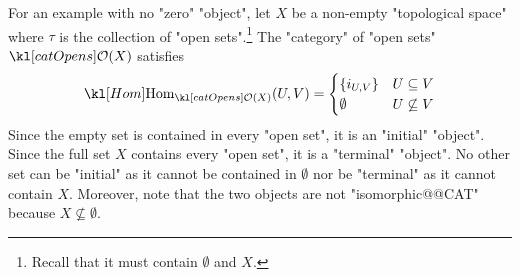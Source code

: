 \documentclass[main.tex]{subfiles}
\begin{document}
\begin{exmps}
\begin{enumerate}
		For an example with no "zero" "object", let $X$ be a non-empty "topological space" where $\tau$ is the collection of "open sets".\footnote{Recall that it must contain $\emptyset$ and $X$.} The "category" of "open sets" $\catOpens(X)$ satisfies
		\[\Hom_{\catOpens(X)}(U,V) = \begin{cases}\{i_{U,V}\} & U \subseteq V\\ \emptyset & U \not\subseteq V\end{cases}\]
		Since the empty set is contained in every "open set", it is an "initial" "object". Since the full set $X$ contains every "open set", it is a "terminal" "object". No other set can be "initial" as it cannot be contained in $\emptyset$ nor be "terminal" as it cannot contain $X$. Moreover, note that the two objects are not "isomorphic@@CAT" because $X \not\subseteq \emptyset$.
	\end{enumerate}
\end{exmps}
\end{document}
